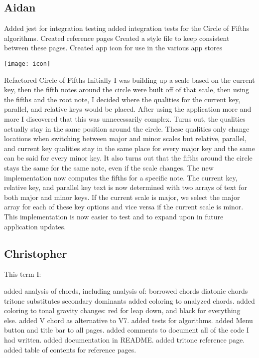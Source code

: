\documentclass[onecolumn, draftclsnofoot,10pt, compsoc]{IEEEtran}
\begin{document}
\subsection{Aidan}
\begin{outline}
\1 Added jest for integration testing
\2 added integration tests for the Circle of Fifths algorithms.
\1 Created reference pages
\2 Created a style file to keep consistent between these pages.
\1 Created app icon for use in the various app stores
\begin{center}
\texttt{[image: icon]}
\end{center}

\1 Refactored Circle of Fifths
\2 Initially I was building up a scale based on the current key, then the fifth notes around the circle were built off of that scale, then using the fifths and the root note, I decided where the qualities for the current key, parallel, and relative keys would be placed. After using the application more and more I discovered that this was unnecessarily complex.
\2 Turns out, the qualities actually stay in the same position around the circle. These qualities only change locations when switching between major and minor scales but relative, parallel, and current key qualities stay in the same place for every major key and the same can be said for every minor key.
\2 It also turns out that the fifths around the circle stays the same for the same note, even if the scale changes.
\2 The new implementation now computes the fifths for a specific note. The current key, relative key, and parallel key text is now determined with two arrays of text for both major and minor keys. If the current scale is major, we select the major array for each of these key options and vice versa if the current scale is minor. This implementation is now easier to test and to expand upon in future application updates.

\end{outline}
\subsection{Christopher}
This term I:
\begin{outline}
\1 added analysis of chords, including analysis of:
\2 borrowed chords
\2 diatonic chords
\2 tritone substitutes
\2 secondary dominants
\1 added coloring to analyzed chords.
\1 added coloring to tonal gravity changes: red for leap down, and black for everything else.
\1 added V chord as alternative to V7.
\1 added tests for algorithms.
\1 added Menu button and title bar to all pages.
\1 added comments to document all of the code I had written.
\1 added documentation in README.
\1 added tritone reference page.
\1 added table of contents for reference pages.
\end{outline}
\end{document}

